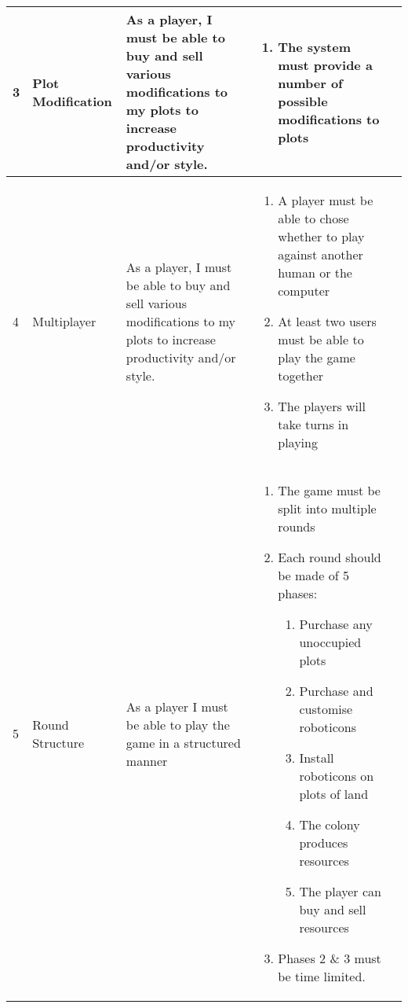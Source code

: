 \documentclass{article}
\begin{document}
\begin{landscape}
\begin{longtable}{|l||l|p{4cm}|p{8cm}|p{7cm}|}
	3 & Plot Modification
	& As a player, I must be able to buy and sell various modifications to my plots to increase productivity and/or style.
	& \begin{enumerate}[label=3.1.\arabic*.]
		\item The system must provide a number of possible modifications to plots
	\end{enumerate} & \\ \hline

	4 & Multiplayer
	& As a player, I must be able to buy and sell various modifications to my plots to increase productivity and/or style.
	& \begin{enumerate}[label=4.1.\arabic*.]
		\item A player must be able to chose whether to play against another human or the computer
		\item At least two users must be able to play the game together
		\item The players will take turns in playing
	\end{enumerate} & \\ \hline

	5 & Round Structure
	& As a player I must be able to play the game in a structured manner
	& \begin{enumerate}[label=5.1.\arabic*.]
		\item The game must be split into multiple rounds
		\item Each round should be made of 5 phases:
		\begin{enumerate}[label=\arabic*.]
			\item Purchase any unoccupied plots
			\item Purchase and customise roboticons
			\item Install roboticons on plots of land
			\item The colony produces resources
			\item The player can buy and sell resources
		\end{enumerate}
		\item Phases 2 \& 3 must be time limited. 
	\end{enumerate} & \\ \hline


\end{longtable}
\end{landscape}
\end{document}
